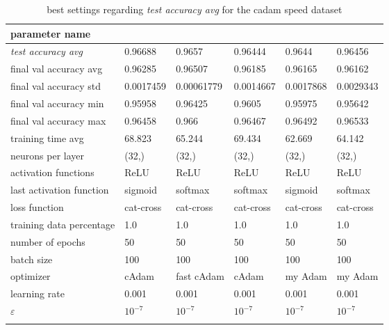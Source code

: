 \begin{longtable}{|l|>{\columncolor{bestColumnColor}}l|l|l|l|l|}
\hline
\textbf{parameter name} & \multicolumn{5}{c|}{\textbf{best values}} \\
\hline
\textit{test accuracy avg} & 0.96688 &  0.9657 & 0.96444 &  0.9644 & 0.96456 \\
final val accuracy avg   & 0.96285 & 0.96507 & 0.96185 & 0.96165 & 0.96162 \\
final val accuracy std   & 0.0017459 & 0.00061779 & 0.0014667 & 0.0017868 & 0.0029343 \\
final val accuracy min   & 0.95958 & 0.96425 & 0.9605  & 0.95975 & 0.95642 \\
final val accuracy max   & 0.96458 & 0.966   & 0.96467 & 0.96492 & 0.96533 \\
training time avg        & 68.823  & 65.244  & 69.434  & 62.669  & 64.142  \\
{\color{equalParamColor} neurons per layer } & {\color{equalParamColor} (32,) } & {\color{equalParamColor} (32,) } & {\color{equalParamColor} (32,) } & {\color{equalParamColor} (32,) } & {\color{equalParamColor} (32,) } \\
{\color{equalParamColor} activation functions } & {\color{equalParamColor} ReLU } & {\color{equalParamColor} ReLU } & {\color{equalParamColor} ReLU } & {\color{equalParamColor} ReLU } & {\color{equalParamColor} ReLU } \\
last activation function & sigmoid & softmax & softmax & sigmoid & softmax \\
{\color{equalParamColor} loss function } & {\color{equalParamColor} cat-cross } & {\color{equalParamColor} cat-cross } & {\color{equalParamColor} cat-cross } & {\color{equalParamColor} cat-cross } & {\color{equalParamColor} cat-cross } \\
{\color{equalParamColor} training data percentage } & {\color{equalParamColor} 1.0 } & {\color{equalParamColor} 1.0 } & {\color{equalParamColor} 1.0 } & {\color{equalParamColor} 1.0 } & {\color{equalParamColor} 1.0 } \\
{\color{equalParamColor} number of epochs } & {\color{equalParamColor} 50 } & {\color{equalParamColor} 50 } & {\color{equalParamColor} 50 } & {\color{equalParamColor} 50 } & {\color{equalParamColor} 50 } \\
{\color{equalParamColor} batch size } & {\color{equalParamColor} 100 } & {\color{equalParamColor} 100 } & {\color{equalParamColor} 100 } & {\color{equalParamColor} 100 } & {\color{equalParamColor} 100 } \\
optimizer                & cAdam   & fast cAdam & cAdam   & my Adam & my Adam \\
{\color{equalParamColor} learning rate } & {\color{equalParamColor} 0.001 } & {\color{equalParamColor} 0.001 } & {\color{equalParamColor} 0.001 } & {\color{equalParamColor} 0.001 } & {\color{equalParamColor} 0.001 } \\
{\color{equalParamColor} $\varepsilon$ } & {\color{equalParamColor} $10^{-7}$ } & {\color{equalParamColor} $10^{-7}$ } & {\color{equalParamColor} $10^{-7}$ } & {\color{equalParamColor} $10^{-7}$ } & {\color{equalParamColor} $10^{-7}$ } \\
\hline

\caption{best settings regarding \textit{test accuracy avg} for the cadam speed dataset}
\label{table:variant_test_accuracy_avg_best_cadam_speed}
\end{longtable}
